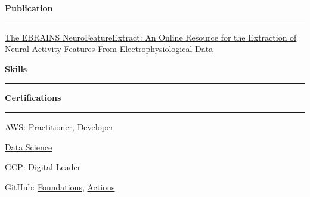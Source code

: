 \documentclass[11pt,letterpaper]{article}
\begin{document}
\begin{justify}
\begin{multicols}{2}
\begin{itemize}[label={}, itemsep=-5pt, leftmargin=0pt]
\begin{item}
                  \end{item}
            \end{itemize}
            \vspace*{\fill}
            \columnbreak
            \textbf{Publication}\strut
            \hrule
            \begin{itemize}[label={}, leftmargin=0pt, noitemsep]
                  \begin{item}
                        \href{https://www.frontiersin.org/articles/10.3389/fninf.2021.713899/full}{The EBRAINS NeuroFeatureExtract: An Online Resource for the Extraction of Neural Activity Features From Electrophysiological Data}
                  \end{item}
            \end{itemize}
            \vspace*{\fill}
      \end{multicols}
      \vspace{0.1cm}
      {\large \textbf{Skills}\strut}
      \hrule
      \begin{multicols}{3}
            \textbf{Certifications}\strut
            \hrule
            \begin{itemize}[label={}, itemsep=-5pt, leftmargin=0pt]
                  \begin{item}
                        AWS:
                        \href{https://www.credly.com/badges/33614ca6-2f0d-456b-87e9-bf8b8591cbf8/public_url}{Practitioner},
                        \href{https://www.credly.com/badges/e9b6c64c-2175-4345-950b-6331fd88af43/public_url}{Developer}
                  \end{item}
                  \begin{item}
                        \href{https://dariocurr.github.io/assets/doc/data_science.pdf}{Data Science}
                  \end{item}
                  \begin{item}
                        GCP:
                        \href{https://www.credly.com/badges/0f158c45-adb0-4ac9-9d5f-0039649e4808/public_url}{Digital Leader}
                  \end{item}
                  \begin{item}
                        GitHub:
                        \href{https://www.credly.com/badges/0f59d53a-1ecb-4f6f-8a84-96fa3cb55965/public_url}{Foundations},
                        \href{https://www.credly.com/badges/6da40853-2bc6-4738-887e-8710a10e7a29/public_url}{Actions}
                  \end{item}

\end{itemize}
\end{multicols}
\end{justify}
\end{document}
